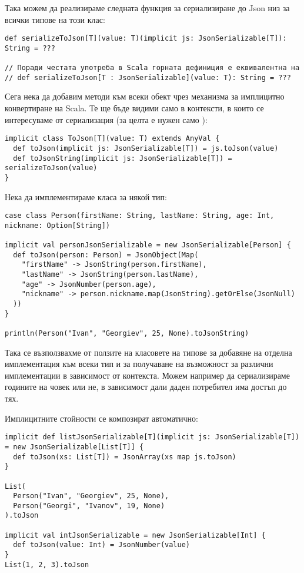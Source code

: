 Така можем да реализираме следната функция за сериализиране до Json низ за всички типове на този клас:

\begin{lstlisting}[texcl=true]
def serializeToJson[T](value: T)(implicit js: JsonSerializable[T]): String = ???

// Поради честата употреба в Scala горната дефиниция е еквивалентна на
// def serializeToJson[T : JsonSerializable](value: T): String = ???
\end{lstlisting}

Сега нека да добавим  методи към всеки обект чрез механизма за имплицитно конвертиране на Scala. Те ще бъде видими само в контексти, в които се интересуваме от сериализация (за целта е нужен само ):

\begin{lstlisting}
implicit class ToJson[T](value: T) extends AnyVal {
  def toJson(implicit js: JsonSerializable[T]) = js.toJson(value)
  def toJsonString(implicit js: JsonSerializable[T]) = serializeToJson(value)
}
\end{lstlisting}

Нека да имплементираме класа за някой тип:

\begin{lstlisting}
case class Person(firstName: String, lastName: String, age: Int, nickname: Option[String])

implicit val personJsonSerializable = new JsonSerializable[Person] {
  def toJson(person: Person) = JsonObject(Map(
    "firstName" -> JsonString(person.firstName),
    "lastName" -> JsonString(person.lastName),
    "age" -> JsonNumber(person.age),
    "nickname" -> person.nickname.map(JsonString).getOrElse(JsonNull)
  ))
}

println(Person("Ivan", "Georgiev", 25, None).toJsonString)
\end{lstlisting}

Така се възползвахме от ползите на класовете на типове за добавяне на отделна имплементация към всеки тип и за получаване на възможност за различни имплементации в зависимост от контекста. Можем например да сериализираме годините на човек или не, в зависимост дали даден потребител има достъп до тях.

Имплицитните стойности се композират автоматично:

\begin{lstlisting}
implicit def listJsonSerializable[T](implicit js: JsonSerializable[T]) = new JsonSerializable[List[T]] {
  def toJson(xs: List[T]) = JsonArray(xs map js.toJson)
}

List(
  Person("Ivan", "Georgiev", 25, None),
  Person("Georgi", "Ivanov", 19, None)
).toJson

implicit val intJsonSerializable = new JsonSerializable[Int] {
  def toJson(value: Int) = JsonNumber(value)
}
List(1, 2, 3).toJson
\end{lstlisting}

